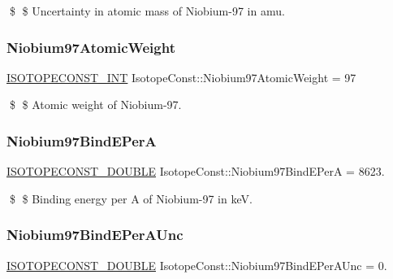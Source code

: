 \$ \$ Uncertainty in atomic mass of Niobium-\/97 in amu. \mbox{\label{group___isotope_const-_niobium-_nb97_gafc54b1d8c2c86e308ddf5ffa4666bd70}} 
\subsubsection{\texorpdfstring{Niobium97\+Atomic\+Weight}{Niobium97AtomicWeight}}
{\footnotesize\ttfamily \mbox{\hyperlink{group___isotope_const-_macros_ga5f18360b3e99483a35c32d789e62621c}{I\+S\+O\+T\+O\+P\+E\+C\+O\+N\+S\+T\+\_\+\+I\+NT}} Isotope\+Const\+::\+Niobium97\+Atomic\+Weight = 97}

\$ \$ Atomic weight of Niobium-\/97. \mbox{\label{group___isotope_const-_niobium-_nb97_ga91eaf7cc861e44720c07b42600818370}} 
\subsubsection{\texorpdfstring{Niobium97\+Bind\+E\+PerA}{Niobium97BindEPerA}}
{\footnotesize\ttfamily \mbox{\hyperlink{group___isotope_const-_macros_ga8f45a7272ce02c0b4c65c44636ed719a}{I\+S\+O\+T\+O\+P\+E\+C\+O\+N\+S\+T\+\_\+\+D\+O\+U\+B\+LE}} Isotope\+Const\+::\+Niobium97\+Bind\+E\+PerA = 8623.}

\$ \$ Binding energy per A of Niobium-\/97 in keV. \mbox{\label{group___isotope_const-_niobium-_nb97_ga8710a5edf4ab3ceae558cf36778cc183}} 
\subsubsection{\texorpdfstring{Niobium97\+Bind\+E\+Per\+A\+Unc}{Niobium97BindEPerAUnc}}
{\footnotesize\ttfamily \mbox{\hyperlink{group___isotope_const-_macros_ga8f45a7272ce02c0b4c65c44636ed719a}{I\+S\+O\+T\+O\+P\+E\+C\+O\+N\+S\+T\+\_\+\+D\+O\+U\+B\+LE}} Isotope\+Const\+::\+Niobium97\+Bind\+E\+Per\+A\+Unc = 0.}

